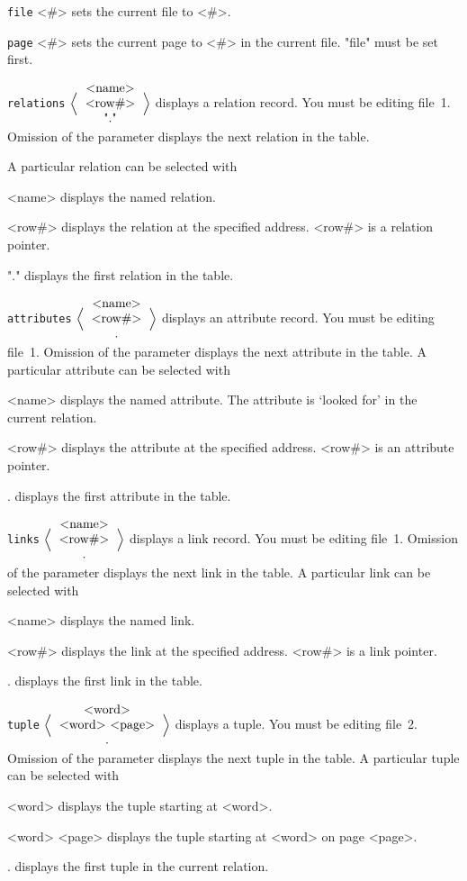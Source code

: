 \documentclass[11pt,a4paper]{report}
\def\Opt#1{$\Bigl\langle \mbox{#1} \Bigr\rangle$}
\def\stk#1{\begin{tabular}[c]{c}#1\end{tabular}}
\begin{document}
\verb|file| <\#>\>
sets the current file to <\#>.
 
\verb|page| <\#>\>
sets the current page to <\#> in the current file.
"file" must be set first.
 
\verb|relations| \Opt{\stk{<name>\\<row\#>\\"."}}\>
displays a relation record.
You must be editing file~1.
 Omission of the parameter displays
the next relation in the table. 

A particular relation can
be selected with
\begin{List}
\item[<name>] displays the named relation.
\item[<row\#>] displays the relation at the specified address.
  <row\#> is a relation pointer.
\item["."] displays the first relation in the table.
\end{List}
 
\verb|attributes| \Opt{\stk{<name>\\<row\#>\\.}}\>
displays an attribute record.
You must be editing file~1.
 Omission of the parameter displays
the next attribute in the table. A particular attribute can
be selected with
\begin{List}
\item[<name>] displays the named attribute.
 The attribute is `looked for' in the current relation.
\item[<row\#>] displays the attribute at the specified address.
  <row\#> is an attribute pointer.
\item[.] displays the first attribute in the table.
\end{List}
 
\verb|links| \Opt{\stk{<name>\\<row\#>\\.}}\>
displays a link record.
You must be editing file~1.
 Omission of the parameter displays
the next link in the table. A particular link can
be selected with
\begin{List}
\item[<name>] displays the named link.
\item[<row\#>] displays the link at the specified address.
  <row\#> is a link pointer.
\item[.] displays the first link in the table.
\end{List}
 
\verb|tuple| \Opt{\stk{<word>\\<word> <page>\\.}}\>
displays a tuple.
You must be editing file~2.
 Omission of the parameter displays
the next tuple in the table. A particular tuple can
be selected with
\begin{List}
\item[<word>] displays the tuple starting at <word>.
\item[<word> <page>] displays the tuple starting at <word> on page <page>.
\item[.] displays the first tuple in the current relation.
\end{List}
 
\end{document}
